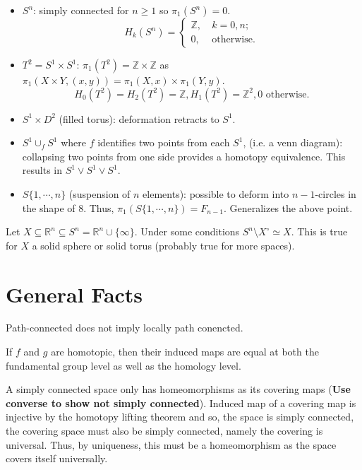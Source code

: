 \documentclass[]{article}
\theoremstyle{definition}
\begin{document}
\begin{itemize}
  \item \(S^n\): simply connected for \(n \ge 1\) so \(\pi_1(S^n) = 0\). 
  \[H_k(S^n) = \begin{cases}
    \mathbb{Z}, \ & k = 0, n;\\
    0, \ & \text{otherwise}.
  \end{cases}\]
  \item \(T^2 = S^1 \times S^1\): \(\pi_1(T^2) = \mathbb{Z} \times \mathbb{Z}\) as 
    \(\pi_1(X \times Y, (x, y)) = \pi_1(X, x) \times \pi_1(Y, y)\).
    \[H_0(T^2) = H_2(T^2) = \mathbb{Z}, H_1(T^2) = \mathbb{Z}^2, 0 \text{ otherwise}.\]
  \item \(S^1 \times D^2\) (filled torus): deformation retracts to \(S^1\).
  \item \(S^1 \cup_f S^1\) where \(f\) identifies two points from each \(S^1\), (i.e. a venn diagram):
    collapsing two points from one side provides a homotopy equivalence. This results in 
    \(S^1 \vee S^1 \vee S^1\).
  \item \(S\{1, \cdots, n\}\) (suspension of \(n\) elements): possible to deform into \(n - 1\)-circles 
    in the shape of 8. Thus, \(\pi_1(S\{1, \cdots, n\}) = F_{n - 1}\). Generalizes the above point.
\end{itemize}

Let \(X \subseteq \mathbb{R}^n \subseteq S^n = \mathbb{R}^n \cup \{\infty\}\). Under some conditions 
\(S^n \setminus X^\circ \simeq X\). This is true for \(X\) a solid sphere or solid torus 
(probably true for more spaces).

\section*{General Facts}

Path-connected does not imply locally path conencted.

If \(f\) and \(g\) are homotopic, then their induced maps are equal at both the fundamental group 
level as well as the homology level.

A simply connected space only has homeomorphisms as its covering maps (\textbf{Use converse to show 
not simply connected}). Induced map of a covering map is injective by the homotopy lifting theorem 
and so, the space is simply connected, the covering space must also be simply connected, namely 
the covering is universal. Thus, by uniqueness, this must be a homeomorphism as the space covers 
itself universally.
\end{document}
